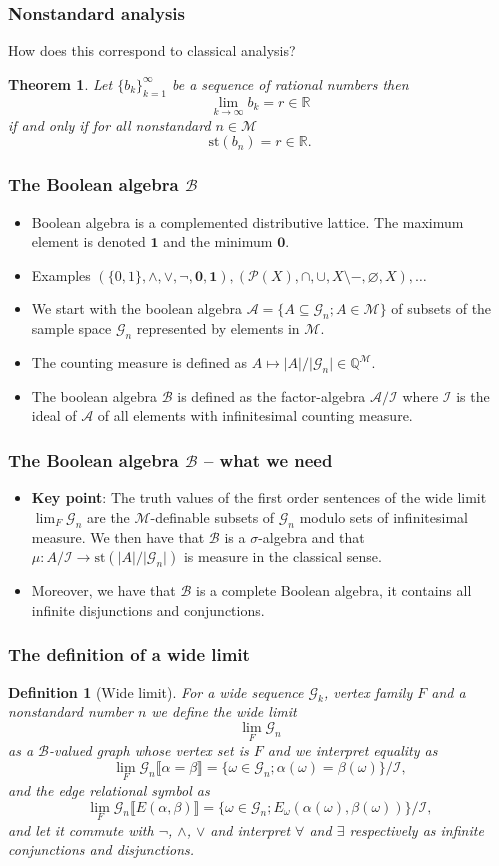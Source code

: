 \documentclass{beamer}
\renewcommand{\P}{\mathcal{P}}
\newcommand{\Q}{\mathbb{Q}}
\newcommand{\R}{\mathbb{R}}
\newcommand{\M}{\mathcal{M}}
\newcommand{\A}{\mathcal{A}}
\newcommand{\B}{\mathcal{B}}
\newcommand{\I}{\mathcal{I}}
\newcommand{\st}{\text{st}}
\newcommand{\bbl}{\llbracket}
\newcommand{\bbr}{\rrbracket}
\newcommand{\G}{\mathcal{G}}
\newcommand{\0}{\textbf{0}}
\newcommand{\1}{\textbf{1}}
\newcommand{\abs}[1]{\lvert #1 \rvert}
\newtheorem{thrm}{Theorem}
\newtheorem{defi}{Definition}
\begin{document}
\begin{frame}
\frametitle{Nonstandard analysis}

How does this correspond to classical analysis?
\pause
\begin{thrm}
Let $\{b_k\}_{k=1}^\infty$ be a sequence of rational numbers then
\[\lim_{k\to\infty}b_k=r\in \R\]
if and only if for all nonstandard $n\in \M$
\[\st(b_n)=r\in \R.\]

\end{thrm}
\end{frame}

\begin{frame}
\frametitle{The Boolean algebra $\B$}
\begin{itemize}[<+->]
\item Boolean algebra is a complemented distributive lattice. The maximum element is denoted $\1$ and the minimum $\0$.
\item Examples $(\{0,1\},\land,\lor,\lnot,\0,\1),(\P(X),\cap,\cup,X\setminus -, \varnothing,X),\dots$
\item We start with the boolean algebra $\A=\{A\subseteq \G_n; A\in \M\}$ of subsets of the sample space $\G_n$ represented by elements in $\M$.
\item The counting measure is defined as $A\mapsto \abs{A}/\abs{\G_n}\in\Q^\M$.
\item The boolean algebra $\B$ is defined as the factor-algebra $\A/\I$ where $\I$ is the ideal of $\A$ of all elements with infinitesimal counting measure.
\end{itemize}
\end{frame}

\begin{frame}
\frametitle{The Boolean algebra $\B$ -- what we need}
\begin{itemize}[<+->]
\item \textbf{Key point}: The truth values of the first order sentences of the wide limit $\lim_{F}\G_n$ are the $\M$-definable subsets of $\G_n$ modulo sets of infinitesimal measure. We then have that $\B$ is a $\sigma$-algebra and that $\mu:A/\I \to \st(\abs{A}/\abs{\G_n})$ is measure in the classical sense.
\item Moreover, we have that $\B$ is a complete Boolean algebra, it contains all infinite disjunctions and conjunctions.
\end{itemize}
\end{frame}

\begin{frame}
\frametitle{The definition of a wide limit}
\begin{defi}[Wide limit]
For a wide sequence $\G_k$, vertex family $F$ and a nonstandard number $n$ we define the wide limit
\[\lim_F \G_n\]
as a $\B$-valued graph whose vertex set is $F$ and we interpret equality as
\[\lim_F\G_n\bbl\alpha = \beta \bbr=\{\omega \in \G_n; \alpha(\omega)=\beta(\omega) \}/\I,\]
and the edge relational symbol as
\[\lim_F\G_n\bbl E(\alpha,\beta) \bbr=\{\omega \in \G_n; E_\omega(\alpha(\omega),\beta(\omega)) \}/\I,\]
and let it commute with $\lnot$, $\land$, $\lor$ and interpret $\forall$ and $\exists$ respectively as infinite conjunctions and disjunctions.
\end{defi}
\end{frame}
\end{document}
